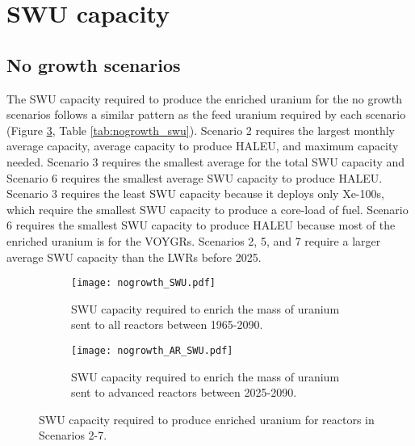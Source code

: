 \section{SWU capacity}
\subsection{No growth scenarios}
The \gls{SWU} capacity required to produce the enriched uranium for 
the no growth scenarios follows a similar pattern as 
the feed uranium required by each scenario (Figure \ref{fig:nogrowth_swu}, 
Table \ref{tab:nogrowth_swu}). Scenario 2 requires the largest monthly 
average capacity, average capacity to produce \gls{HALEU}, and maximum 
capacity needed. Scenario 3 requires the smallest average for the total 
\gls{SWU} capacity and Scenario 6 requires the smallest average 
\gls{SWU} capacity to produce \gls{HALEU}. Scenario 3 requires the least 
\gls{SWU} capacity because it deploys only Xe-100s, which require the 
smallest \gls{SWU} capacity to produce a core-load of fuel. 
Scenario 6 requires the smallest \gls{SWU} capacity to produce \gls{HALEU}
because most of the enriched uranium is for the 
VOYGRs. Scenarios 2, 5, and 7 require a larger average \gls{SWU} capacity 
than the \glspl{LWR} before 2025. 

\begin{figure}
    \centering
    \begin{subfigure}[b]{0.45\textwidth}
        \centering
        \texttt{[image: nogrowth\_SWU.pdf]}
        \caption{\gls{SWU} capacity required to enrich the mass of 
        uranium sent to all reactors between 1965-2090.}
        \label{fig:nogrowth_all_SWU}
    \end{subfigure}
    \hfill
    \begin{subfigure}[b]{0.45\textwidth}
        \centering
        \texttt{[image: nogrowth\_AR\_SWU.pdf]}
        \caption{\gls{SWU} capacity required to enrich the mass of 
        uranium sent to advanced reactors between 2025-2090.}
        \label{fig:nogrowth_AR_SWU}
    \end{subfigure}
       \caption{\gls{SWU} capacity required to produce enriched uranium 
       for reactors in Scenarios 2-7.}
       \label{fig:nogrowth_swu}
\end{figure}

